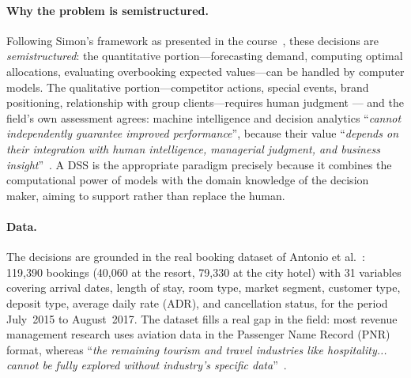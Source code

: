 \paragraph{Why the problem is semistructured.}
Following Simon's framework as presented in the course~\cite{turban2011}, these decisions are \emph{semistructured}: the quantitative portion---forecasting demand, computing optimal allocations, evaluating overbooking expected values---can be handled by computer models. The qualitative portion---competitor actions, special events, brand positioning, relationship with group clients---requires human judgment --- and the field's own assessment agrees: machine intelligence and decision analytics ``\emph{cannot independently guarantee improved performance}'', because their value ``\emph{depends on their integration with human intelligence, managerial judgment, and business insight}''~\cite{jawabreh2026}.
A DSS is the appropriate paradigm precisely because it combines the computational power of models with the domain knowledge of the decision maker, aiming to support rather than replace the human.

\paragraph{Data.}
The decisions are grounded in the real booking dataset of Antonio et al.~\cite{antonio2019}: 119{,}390 bookings (40{,}060 at the resort, 79{,}330 at the city hotel) with 31 variables covering arrival dates, length of stay, room type, market segment, customer type, deposit type, average daily rate (ADR), and cancellation status, for the period July~2015 to August~2017.
The dataset fills a real gap in the field: most revenue management research uses aviation data in the Passenger Name Record (PNR) format, whereas ``\emph{the remaining tourism and travel industries like hospitality... cannot be fully explored without industry's specific data}''~\cite{antonio2019}.
